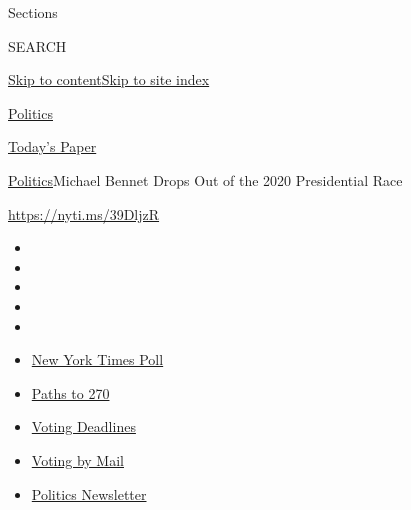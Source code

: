 Sections

SEARCH

\protect\hyperlink{site-content}{Skip to
content}\protect\hyperlink{site-index}{Skip to site index}

\href{https://www.nytimes3xbfgragh.onion/section/politics}{Politics}

\href{https://myaccount.nytimes3xbfgragh.onion/auth/login?response_type=cookie\&client_id=vi}{}

\href{https://www.nytimes3xbfgragh.onion/section/todayspaper}{Today's
Paper}

\href{/section/politics}{Politics}\textbar{}Michael Bennet Drops Out of
the 2020 Presidential Race

\url{https://nyti.ms/39DljzR}

\begin{itemize}
\item
\item
\item
\item
\item
\end{itemize}

\begin{itemize}
\item
  \href{https://www.nytimes3xbfgragh.onion/2020/09/12/us/politics/biden-trump-poll-wisconsin-minnesota.html?action=click\&pgtype=Article\&state=default\&region=TOP_BANNER\&context=storylines_menu}{New
  York Times Poll}
\item
  \href{https://www.nytimes3xbfgragh.onion/interactive/2020/us/elections/election-states-biden-trump.html?action=click\&pgtype=Article\&state=default\&region=TOP_BANNER\&context=storylines_menu}{Paths
  to 270}
\item
  \href{https://www.nytimes3xbfgragh.onion/interactive/2019/us/elections/2020-presidential-election-calendar.html?action=click\&pgtype=Article\&state=default\&region=TOP_BANNER\&context=storylines_menu}{Voting
  Deadlines}
\item
  \href{https://www.nytimes3xbfgragh.onion/interactive/2020/08/31/us/politics/vote-by-mail-deadlines.html?action=click\&pgtype=Article\&state=default\&region=TOP_BANNER\&context=storylines_menu}{Voting
  by Mail}
\item
  \href{https://www.nytimes3xbfgragh.onion/newsletters/politics?action=click\&pgtype=Article\&state=default\&region=TOP_BANNER\&context=storylines_menu}{Politics
  Newsletter}
\end{itemize}

